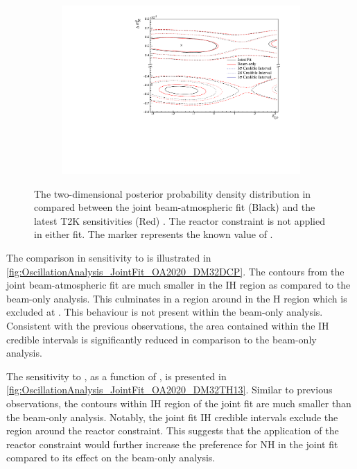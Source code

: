 \begin{figure}[h]
  \begin{subfigure}[t]{0.98\textwidth}
    \includegraphics[width=\textwidth, trim={0mm 0mm 0mm 0mm}, clip,page=1]{Figures/OA/JointFit_OA2020_Comp/ContourComparison_2D_dcp_dm32_BH_1_woRC_UnSmeared_CredibleInterval.pdf}
  \end{subfigure}
  \caption{The two-dimensional posterior probability density distribution in  compared between the joint beam-atmospheric fit (Black) and the latest T2K sensitivities (Red) \cite{Dunne2020-uf, t2k_tn_393}. The reactor constraint is not applied in either fit. The marker represents the known value of .}
  \label{fig:OscillationAnalysis_JointFit_OA2020_DM32DCP}
\end{figure}

The comparison in sensitivity to  is illustrated in \autoref{fig:OscillationAnalysis_JointFit_OA2020_DM32DCP}. The contours from the joint beam-atmospheric fit are much smaller in the IH region as compared to the beam-only analysis. This culminates in a region around  in the H region which is excluded at \quickmath{3\sigma}. This behaviour is not present within the beam-only analysis. Consistent with the previous observations, the area contained within the IH credible intervals is significantly reduced in comparison to the beam-only analysis.

The sensitivity to , as a function of , is presented in \autoref{fig:OscillationAnalysis_JointFit_OA2020_DM32TH13}. Similar to previous observations, the  contours within IH region of the joint fit are much smaller than the beam-only analysis. Notably, the joint fit IH \quickmath{1\sigma} credible intervals exclude the region around the reactor constraint. This suggests that the application of the reactor constraint would further increase the preference for NH in the joint fit compared to its effect on the beam-only analysis.


